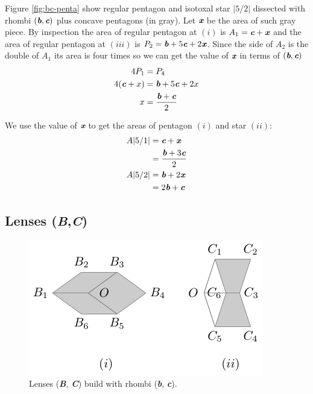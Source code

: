 \documentclass[11pt]{article}
\def\mathbi#1{\textbf{\em #1}}
\begin{document}
Figure \ref{fig:bc-penta} show regular pentagon and isotoxal star $|5/2|$ dissected with rhombi $(\mathbi{b},\mathbi{c})$ plus concave pentagons (in gray). Let $\mathbi{x}$ be the area of such gray piece. By inspection the area of regular pentagon at $(i)$ is $A_1 = \mathbi{c} + \mathbi{x}$ and the area of regular pentagon at $(iii)$ is $P_2 = \mathbi{b} + 5\mathbi{c} + 2\mathbi{x}$. Since the side of $A_2$ is the double of $A_1$ its area is four times so we can get the value of $\mathbi{x}$ in terms of $(\mathbi{b},\mathbi{c})$
\begin{align}
4P_1 &= P_4 \nonumber\\
4(\mathbi{c} + x) &= \mathbi{b} + 5\mathbi{c} + 2x\nonumber\\
x &= \frac{\mathbi{b} + \mathbi{c}}2
\end{align}

We use the value of $\mathbi{x}$ to get the areas of pentagon $(i)$ and star $(ii)$:
\begin{align}
A|5/1| &= \mathbi{c} + \mathbi{x} \nonumber\\
 &= \frac{\mathbi{b} + 3\mathbi{c}}2 \\
A|5/2| &= \mathbi{b} + 2\mathbi{x} \nonumber\\
 &= 2\mathbi{b} + \mathbi{c}
\end{align}

\subsection{Lenses (\mathbi{B},\mathbi{C})}

\begin{figure}[H]
\centering
\includegraphics[scale=1.1]{bc/bc}
\caption{Lenses (\mathbi{B}, \mathbi{C}) build with rhombi (\mathbi{b}, \mathbi{c}).}
\label{fig:bc-lenses}
\end{figure}
\end{document}
